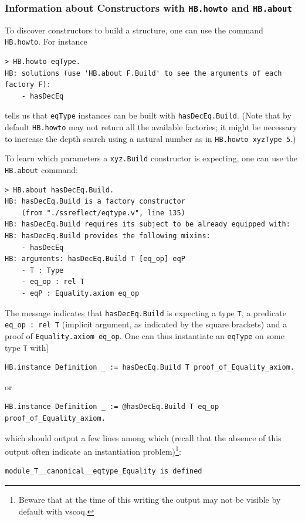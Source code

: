 \documentclass{article}
\def\coqin#1{\texttt{#1}}
\begin{document}
\subsubsection{Information about Constructors with \coqin{HB.howto} and \coqin{HB.about}}
\label{sec:info_constructors}

To discover constructors to build a structure, one can use the command
\coqin{HB.howto}. For instance
\begin{verbatim}
> HB.howto eqType.
HB: solutions (use 'HB.about F.Build' to see the arguments of each factory F):
    - hasDecEq
\end{verbatim}
tells us that \coqin{eqType} instances can be built with \coqin{hasDecEq.Build}.
(Note that by default \coqin{HB.howto} may not return all the available factories;
it might be necessary to increase the depth search using a natural number
as in \coqin{HB.howto xyzType 5}.)

To learn which parameters a \coqin{xyz.Build} constructor is expecting, one
can use the \coqin{HB.about} command:
\begin{verbatim}
> HB.about hasDecEq.Build.
HB: hasDecEq.Build is a factory constructor
    (from "./ssreflect/eqtype.v", line 135)
HB: hasDecEq.Build requires its subject to be already equipped with:
HB: hasDecEq.Build provides the following mixins:
    - hasDecEq
HB: arguments: hasDecEq.Build T [eq_op] eqP
    - T : Type
    - eq_op : rel T
    - eqP : Equality.axiom eq_op
\end{verbatim}
The message indicates that \coqin{hasDecEq.Build} is expecting a type
\coqin{T}, a predicate \coqin{eq_op : rel T} (implicit argument,
as indicated by the square brackets) and a proof of \coqin{Equality.axiom eq_op}.
One can thus instantiate an \coqin{eqType} on some type \coqin{T} with]
\begin{verbatim}
HB.instance Definition _ := hasDecEq.Build T proof_of_Equality_axiom.
\end{verbatim}
or
\begin{verbatim}
HB.instance Definition _ := @hasDecEq.Build T eq_op proof_of_Equality_axiom.
\end{verbatim}
which should output a few lines among which (recall that the absence of this output
often indicate an instantiation problem)\footnote{Beware that at the time of this writing the output may not be visible
by default with vscoq.}:
\begin{verbatim}
module_T__canonical__eqtype_Equality is defined
\end{verbatim}
\end{document}

